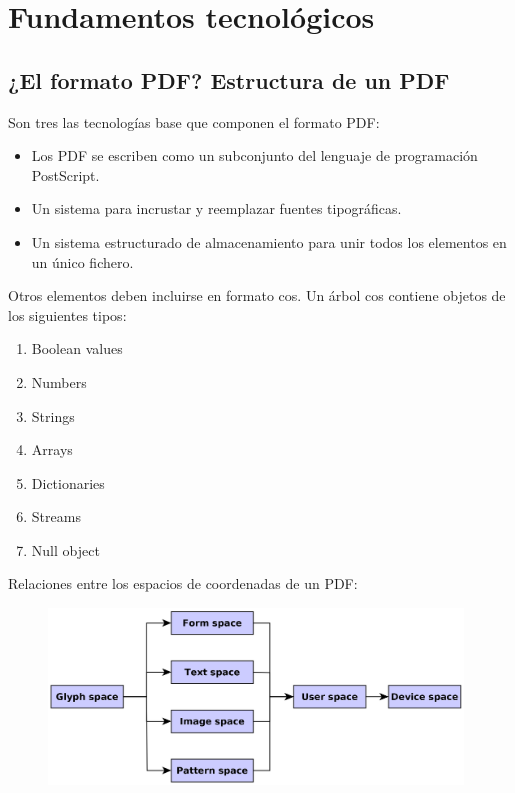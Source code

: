 
\chapter{Fundamentos tecnológicos}
\label{chap:fundamentos-tecnologicos}

\section{¿El formato PDF? Estructura de un PDF}

Son tres las tecnologías base que componen el formato PDF:

\begin{itemize}
	\item Los PDF se escriben como un subconjunto del lenguaje de programación PostScript.
	\item Un sistema para incrustar y reemplazar fuentes tipográficas.
	\item Un sistema estructurado de almacenamiento para unir todos los elementos en un único fichero.
\end{itemize}

Otros elementos deben incluirse en formato \acrfull{cos}. Un árbol cos contiene objetos de los siguientes tipos:

\begin{enumerate}
	\item Boolean values
	\item Numbers
	\item Strings
	\item Arrays
	\item Dictionaries
	\item Streams
	\item Null object
\end{enumerate}

Relaciones entre los espacios de coordenadas de un PDF:

\begin{figure}[hp!]
	\centering
	\includegraphics[width=11cm]{imaxes/espacios-coordenadas.png}
\end{figure}

